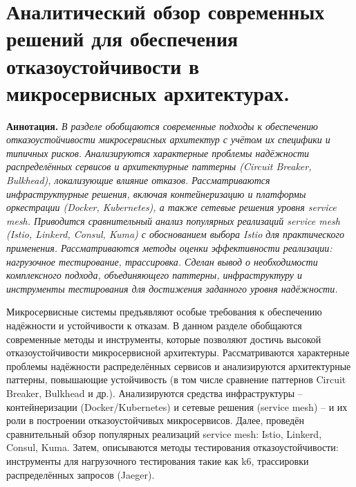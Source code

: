 \chapter{Аналитический обзор современных решений для обеспечения отказоустойчивости в микросервисных архитектурах.}
\label{chapter1}





\textbf{Аннотация. } \textit{В разделе обобщаются современные подходы к обеспечению отказоустойчивости микросервисных архитектур с учётом их специфики и типичных рисков. Анализируются характерные проблемы надёжности распределённых сервисов и архитектурные паттерны (Circuit Breaker, Bulkhead), локализующие влияние отказов. Рассматриваются инфраструктурные решения, включая контейнеризацию и платформы оркестрации (Docker, Kubernetes), а также сетевые решения уровня service mesh. Приводится сравнительный анализ популярных реализаций service mesh (Istio, Linkerd, Consul, Kuma) с обоснованием выбора Istio для практического применения. Рассматриваются методы оценки эффективности реализации: нагрузочное тестирование, трассировка. Сделан вывод о необходимости комплексного подхода, объединяющего паттерны, инфраструктуру и инструменты тестирования для достижения заданного уровня надёжности.}

Микросервисные системы предъявляют особые требования к обеспечению надёжности и устойчивости к отказам. В данном разделе обобщаются современные методы и инструменты, которые позволяют достичь высокой отказоустойчивости микросервисной архитектуры. Рассматриваются характерные проблемы надёжности распределённых сервисов и анализируются архитектурные паттерны, повышающие устойчивость (в том числе сравнение паттернов Circuit Breaker, Bulkhead и др.). Анализируются средства инфраструктуры – контейнеризации (Docker/Kubernetes) и сетевые решения (service mesh) – и их роли в построении отказоустойчивых микросервисов. Далее, проведён сравнительный обзор популярных реализаций service mesh: Istio, Linkerd, Consul, Kuma. Затем, описываются методы тестирования отказоустойчивости: инструменты для нагрузочного тестирования такие как k6, трассировки распределённых запросов (Jaeger).

